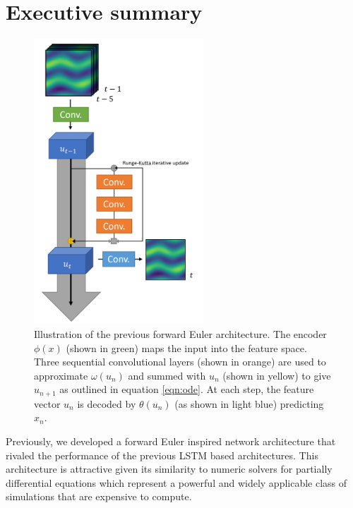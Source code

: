\documentclass[12pt]{article}
\theoremstyle{plain}
\theoremstyle{remark}
\theoremstyle{definition}
\begin{document}


\section{Executive summary}



\begin{figure}

	\centering
	\includegraphics[width=2.5in]{pde_arch_rk4}
	\caption{Illustration of the previous forward Euler architecture. The encoder $\phi(x)$ (shown in green) maps the input into the feature space. Three sequential convolutional layers (shown in orange) are used to approximate $\omega(u_n)$ and summed with $u_n$ (shown in yellow) to give $u_{n+1}$ as outlined in equation \ref{eqn:ode}. At each step, the feature vector $u_n$ is decoded by $\theta(u_n)$ (as shown in light blue) predicting $x_n$. }
	\label{fig:arch_rk4}

\end{figure}


Previously, we developed a forward Euler inspired network architecture that rivaled the performance of the previous LSTM based architectures. This architecture is attractive given its similarity to numeric solvers for partially differential equations which represent a powerful and widely applicable class of simulations that are expensive to compute.
\end{document}
